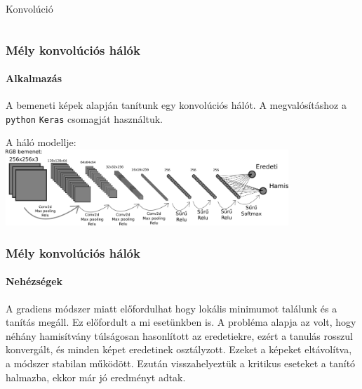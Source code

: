 \documentclass[11pt]{beamer}
\begin{document}
\begin{frame}
\begin{columns}
\begin{column}{.5\textwidth}
			\centering
			Konvolúció
			
		\end{column}				
	\end{columns}
	

\end{frame}


\begin{frame}
	\frametitle{Mély konvolúciós hálók}
	\framesubtitle{Alkalmazás}
	
	A bemeneti képek alapján tanítunk egy konvolúciós hálót. A megvalósításhoz a \texttt{python} \texttt{Keras} csomagját használtuk.	
	
	A háló modellje:
	\includegraphics[width=0.8\textwidth, center]{predictor-network-modell.pdf}
	
	
	

%			
	
	

\end{frame}


\begin{frame}
	\frametitle{Mély konvolúciós hálók}
	\framesubtitle{Nehézségek}
	
	A gradiens módszer miatt előfordulhat hogy lokális minimumot találunk és a tanítás megáll. Ez előfordult a mi esetünkben is. A probléma alapja az volt, hogy néhány hamisítvány túlságosan hasonlított az eredetiekre, ezért a tanulás rosszul konvergált, és minden képet eredetinek osztályzott. Ezeket a képeket eltávolítva, a módszer stabilan működött. Ezután visszahelyeztük a kritikus eseteket a tanító halmazba, ekkor már jó eredményt adtak.
	
	
	

\end{frame}
\end{document}
